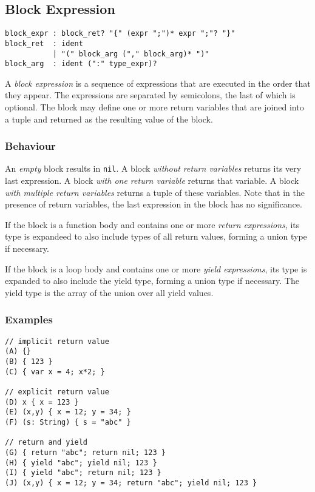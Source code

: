 \subsection{Block Expression}

\begin{lstlisting}[language=EBNF]
block_expr : block_ret? "{" (expr ";")* expr ";"? "}"
block_ret  : ident
           | "(" block_arg ("," block_arg)* ")"
block_arg  : ident (":" type_expr)?
\end{lstlisting}

A \emph{block expression} is a sequence of expressions that are executed in the
order that they appear. The expressions are separated by semicolons, the last of
which is optional. The block may define one or more return variables that are
joined into a tuple and returned as the resulting value of the block.

\subsubsection{Behaviour}

An \emph{empty} block results in \lstinline{nil}. A block \emph{without return
variables} returns its very last expression. A block \emph{with one return
variable} returns that variable. A block \emph{with multiple return variables}
returns a tuple of these variables. Note that in the presence of return
variables, the last expression in the block has no significance.

If the block is a function body and contains one or more \emph{return
expressions}, its type is expandeed to also include types of all return values,
forming a union type if necessary.

If the block is a loop body and contains one or more \emph{yield expressions},
its type is expanded to also include the yield type, forming a union type if
necessary. The yield type is the array of the union over all yield values.

\subsubsection{Examples}

\begin{lstlisting}
// implicit return value
(A) {}
(B) { 123 }
(C) { var x = 4; x*2; }

// explicit return value
(D) x { x = 123 }
(E) (x,y) { x = 12; y = 34; }
(F) (s: String) { s = "abc" }

// return and yield
(G) { return "abc"; return nil; 123 }
(H) { yield "abc"; yield nil; 123 }
(I) { yield "abc"; return nil; 123 }
(J) (x,y) { x = 12; y = 34; return "abc"; yield nil; 123 }
\end{lstlisting}

